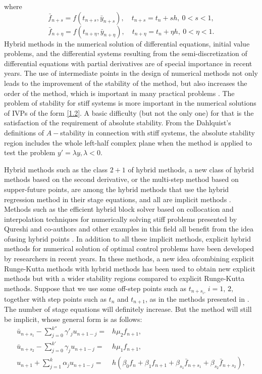 \documentclass[11pt,twoside, final]{amsart}
\begin{document}
where
 $$ \bar{f}_{n+s}=f(t_{n+s},\bar{y}_{n+s}),\quad t_{n+s}=t_{n}+s h,\ 0<s<1,$$
  $$ \bar{f}_{n+\eta}=f(t_{n+\eta},\bar{y}_{n+\eta}),\quad t_{n+\eta}=t_{n}+\eta h,\ 0<\eta<1.$$
Hybrid methods in the numerical solution of differential equations, initial value problems, and the differential systems resulting from the semi-discretization of differential equations with partial derivatives are of special importance in recent years. The use of intermediate points in the design of numerical methods not only leads to the improvement of the stability of the method, but also increases the order of the method, which is important in many practical problems \cite{ALI6,ALI3,ALI5,ALI4,ALI2,ALI1}. 
The problem of stability for stiff systems is more important in the numerical solutions of IVPs of the form \eqref{1.2}. A basic difficulty (but not the only one) for that is the satisfaction of the requirement of absolute stability. From the Dahlquist's definitions of $A-$stability in connection with stiff systems,
the absolute stability region includes the whole  left-half complex plane  when the method is applied to test the problem $y'=\lambda y, \lambda <0$.
\\
\par
\noindent
Hybrid methods such as the class $2+1$ of hybrid methods, a new class of hybrid methods based on the second derivative, or the multi-step method based on supper-future points, are among the hybrid methods that use the hybrid regression method in their stage equations, and all are implicit methods
\cite{ALI6,ALI3,ALI2,ALI1}. Methods such as the efficient hybrid block solver based on collocation and interpolation techniques for numerically solving stiff problems presented by Qureshi and co-authors and other examples in this field all benefit from the idea of ​​using hybrid points \cite{Q24,R23}. In addition to all these implicit methods, explicit hybrid methods for numerical solution of optimal control problems have been developed by researchers in recent years\cite{OCP1, OCP2, OCP3}. In these methods, a new idea of ​​combining explicit Runge-Kutta methods with hybrid methods has been used to obtain new explicit methods but with a wider stability regions compared to explicit Runge-Kutta methods.
Suppose that we  use some off-step points such as $t_{n+s_{i},}\,i=1,\,2,$ together with step points such as $t_{n}$ and $t_{n+1}$,  as in the methods presented in \cite{ALI3,ALI5,ALI4,ALI2,ALI1}. The number of stage equations will definitely increase. But the method will still be implicit, whose general form is as follows:
\begin{align}
 \bar{u}_{n+s_{1}}-\sum_{j=0}^{k''}\gamma'_{j} u_{n+1-j}=& h \mu_{2} f_{n+1},\label{2.1}\\
 \bar{u}_{n+s_{2}}-\sum_{j=0}^{k'}\gamma_{j}u_{n+1-j}=& h\mu_{1} f_{n+1},\label{2.2}\\
u_{n+1}+\sum_{j=1}^{k}\alpha_{j}u_{n+1-j}= &  h(\beta_{0}f_{n}+\beta_{1}f_{n+1}+\beta_{s_{1}}\bar{f}_{n+s_{1}}+\beta_{s_{2}}\bar{f}_{n+s_{2}}), \label{2.3}
\end{align}
\end{document}
